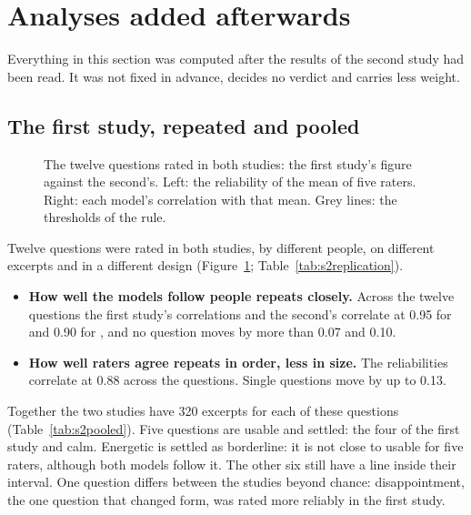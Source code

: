 \section{Analyses added afterwards}\label{sec:further}

Everything in this section was computed after the results of the second study had been read. It was not fixed
in advance, decides no verdict and carries less weight.

\subsection{The first study, repeated and pooled}\label{sec:replication}

\begin{figure}[!htb]\centering

\caption{The twelve questions rated in both studies: the first study's figure against the second's. Left: the
reliability of the mean of five raters. Right: each model's correlation with that mean. Grey lines: the
thresholds of the rule.}\label{fig:s2replication}
\end{figure}

Twelve questions were rated in both studies, by different people, on different excerpts and in a different
design (Figure~\ref{fig:s2replication}; Table~\ref{tab:s2replication}).
\begin{itemize}
\item \textbf{How well the models follow people repeats closely.} Across the twelve questions the first study's
  correlations and the second's correlate at 0.95 for \jev{} and 0.90 for \drex{}, and no question moves by more
  than 0.07 and 0.10.
\item \textbf{How well raters agree repeats in order, less in size.} The reliabilities correlate at 0.88 across
  the questions. Single questions move by up to 0.13.
\end{itemize}

\begin{table}[!htb]\centering
\caption{The twelve questions rated in both studies, pooled by inverse variance. Both studies' figures are for
the mean of five raters with rater levels left in, so that they estimate the same thing; 95\% intervals. The
rule is applied to the pooled figures.}\label{tab:s2pooled}

\end{table}

Together the two studies have 320 excerpts for each of these questions (Table~\ref{tab:s2pooled}). Five
questions are usable and settled: the four of the first study and calm. Energetic is settled as borderline: it
is not close to usable for five raters, although both models follow it. The other six still have a line inside
their interval. One question differs between the studies beyond chance: disappointment, the one question that
changed form, was rated more reliably in the first study.

